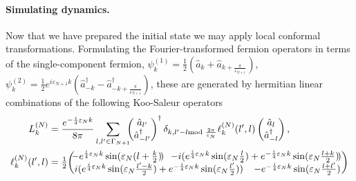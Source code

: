 \documentclass[12pt]{article}
\newcommand{\1}{\mathds{1}}
\begin{document}
\paragraph*{Simulating dynamics.} Now that we have prepared the initial state we may apply local conformal transformations. Formulating the Fourier-transformed fermion operators in terms of the single-component fermion, $\psi^{(1)}_{k}=\tfrac{1}{2}(\hat{a}_{k}+\hat{a}_{k+\frac{\pi}{\varepsilon_{N+1}}})$, $\psi^{(2)}_{k}=\tfrac{1}{2}e^{i\varepsilon_{N+1}k}(\hat{a}^{\dag}_{-k}-\hat{a}^{\dag}_{-k+\frac{\pi}{\varepsilon_{N+1}}})$, these are generated by hermitian linear combinations of the following Koo-Saleur operators
\begin{align}
	L_k^{(N)} & = \frac{e^{-\frac{i}{4}\varepsilon_{N}k}}{8\pi}\sum_{l,l'\in\Gamma_{N+1}} \!\!\! \begin{pmatrix}
		\hat{a}_{l'} \\ \hat{a}^{\dag}_{-l'}
	\end{pmatrix}^{\dag}
	\delta_{k,l'-l\!\!\!\!\mod\frac{2\pi}{\varepsilon_{N}}}
	\ell^{(N)}_{k}(l',l) \begin{pmatrix}
		\hat{a}_{l} \\ \hat{a}^{\dag}_{-l}
	\end{pmatrix}, \\ \nonumber
	\ell^{(N)}_{k}(l',l) & = \tfrac{1}{2}\!\begin{pmatrix} \hspace{-3cm} -e^{\frac{i}{4}\varepsilon_{N}k}\sin(\varepsilon_{N}(l+\tfrac{k}{2})\!) & \hspace{-3cm} -i(e^{\frac{i}{4}\varepsilon_{N}k}\sin(\varepsilon_{N}\tfrac{l}{2})+e^{-\frac{i}{4}\varepsilon_{N}k}\sin(\varepsilon_{N}\tfrac{l+k}{2})\!) \\ i(e^{\frac{i}{4}\varepsilon_{N}k}\sin(\varepsilon_{N}\tfrac{l'-k}{2})+e^{-\frac{i}{4}\varepsilon_{N}k}\sin(\varepsilon_{N}\tfrac{l'}{2})) & -e^{-\frac{i}{4}\varepsilon_{N}k}\sin(\varepsilon_{N}\tfrac{l+l'}{2}) \end{pmatrix}
\end{align}
\end{document}

